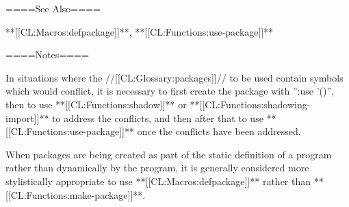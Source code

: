 ====See Also====

**[[CL:Macros:defpackage]]**, **[[CL:Functions:use-package]]**

====Notes====

In situations where the //[[CL:Glossary:packages]]// to be used contain symbols which would conflict, it is necessary to first create the package with '':use '()'', then to use **[[CL:Functions:shadow]]** or **[[CL:Functions:shadowing-import]]** to address the conflicts, and then after that to use **[[CL:Functions:use-package]]** once the conflicts have been addressed.

When packages are being created as part of the static definition of a program rather than dynamically by the program, it is generally considered more stylistically appropriate to use **[[CL:Macros:defpackage]]** rather than **[[CL:Functions:make-package]]**.

 
